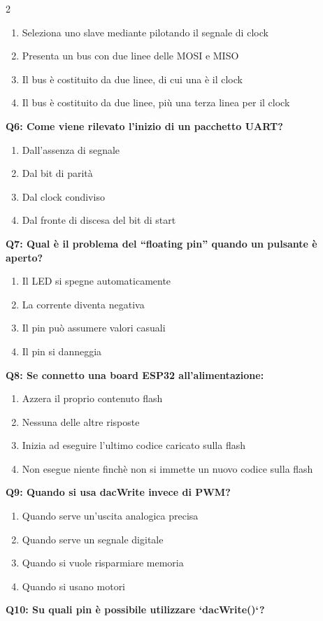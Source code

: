 \documentclass[10pt]{article}
\begin{document}
\begin{multicols}{2}
\begin{enumerate}[label=\arabic*.]
\item Seleziona uno slave mediante pilotando il segnale di clock
\item Presenta un bus con due linee delle MOSI e MISO
\item Il bus è costituito da due linee, di cui una è il clock
\item Il bus è costituito da due linee, più una terza linea per il clock
\end{enumerate}
\textbf{Q6: Come viene rilevato l’inizio di un pacchetto UART?}

\begin{enumerate}[label=\arabic*.]
\item Dall’assenza di segnale
\item Dal bit di parità
\item Dal clock condiviso
\item Dal fronte di discesa del bit di start
\end{enumerate}
\textbf{Q7: Qual è il problema del “floating pin” quando un pulsante è aperto?}

\begin{enumerate}[label=\arabic*.]
\item Il LED si spegne automaticamente
\item La corrente diventa negativa
\item Il pin può assumere valori casuali
\item Il pin si danneggia
\end{enumerate}
\textbf{Q8: Se connetto una board ESP32 all'alimentazione:}

\begin{enumerate}[label=\arabic*.]
\item Azzera il proprio contenuto flash
\item Nessuna delle altre risposte
\item Inizia ad eseguire l'ultimo codice caricato sulla flash
\item Non esegue niente finchè non si immette un nuovo codice sulla flash
\end{enumerate}
\textbf{Q9: Quando si usa dacWrite invece di PWM?}

\begin{enumerate}[label=\arabic*.]
\item Quando serve un’uscita analogica precisa
\item Quando serve un segnale digitale
\item Quando si vuole risparmiare memoria
\item Quando si usano motori
\end{enumerate}
\textbf{Q10: Su quali pin è possibile utilizzare `dacWrite()`?}


\end{multicols}
\end{document}
